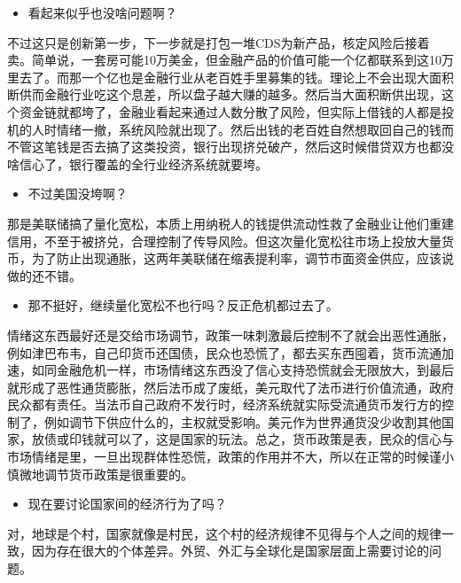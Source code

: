 \documentclass[
  letterpaper,
  DIV=11,
  numbers=noendperiod]{scrreprt}
\providecommand{\tightlist}{%
  \setlength{\itemsep}{0pt}\setlength{\parskip}{0pt}}\usepackage{longtable,booktabs,array}
\begin{document}
\begin{itemize}
\tightlist
\item
  看起来似乎也没啥问题啊？
\end{itemize}

不过这只是创新第一步，下一步就是打包一堆CDS为新产品，核定风险后接着卖。简单说，一套房可能10万美金，但金融产品的价值可能一个亿都联系到这10万里去了。而那一个亿也是金融行业从老百姓手里募集的钱。理论上不会出现大面积断供而金融行业吃这个息差，所以盘子越大赚的越多。然后当大面积断供出现，这个资金链就都垮了，金融业看起来通过人数分散了风险，但实际上借钱的人都是投机的人时情绪一撤，系统风险就出现了。然后出钱的老百姓自然想取回自己的钱而不管这笔钱是否去搞了这类投资，银行出现挤兑破产，然后这时候借贷双方也都没啥信心了，银行覆盖的全行业经济系统就要垮。

\begin{itemize}
\tightlist
\item
  不过美国没垮啊？
\end{itemize}

那是美联储搞了量化宽松，本质上用纳税人的钱提供流动性救了金融业让他们重建信用，不至于被挤兑，合理控制了传导风险。但这次量化宽松往市场上投放大量货币，为了防止出现通胀，这两年美联储在缩表提利率，调节市面资金供应，应该说做的还不错。

\begin{itemize}
\tightlist
\item
  那不挺好，继续量化宽松不也行吗？反正危机都过去了。
\end{itemize}

情绪这东西最好还是交给市场调节，政策一味刺激最后控制不了就会出恶性通胀，例如津巴布韦，自己印货币还国债，民众也恐慌了，都去买东西囤着，货币流通加速，如同金融危机一样，市场情绪这东西没了信心支持恐慌就会无限放大，到最后就形成了恶性通货膨胀，然后法币成了废纸，美元取代了法币进行价值流通，政府民众都有责任。当法币自己政府不发行时，经济系统就实际受流通货币发行方的控制了，例如调节下供应什么的，主权就受影响。美元作为世界通货没少收割其他国家，放债或印钱就可以了，这是国家的玩法。总之，货币政策是表，民众的信心与市场情绪是里，一旦出现群体性恐慌，政策的作用并不大，所以在正常的时候谨小慎微地调节货币政策是很重要的。

\begin{itemize}
\tightlist
\item
  现在要讨论国家间的经济行为了吗？
\end{itemize}

对，地球是个村，国家就像是村民，这个村的经济规律不见得与个人之间的规律一致，因为存在很大的个体差异。外贸、外汇与全球化是国家层面上需要讨论的问题。
\end{document}
